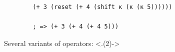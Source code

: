 \begin{frame}[fragile]
	\frametitlesubs

	\begin{center}
		\begin{minipage}{.7\textwidth}
			\begin{verbatim}
        (+ 3 (reset (+ 4 (shift κ (κ (κ 5))))))

        ; => (+ 3 (+ 4 (+ 4 5)))
      \end{verbatim}
		\end{minipage}
	\end{center}

	\pause
	\begin{minipage}[t]{.49\textwidth}
		Several variants of operators:
		\only<.(2)->{\baselineskip}


\end{minipage}
\end{frame}
